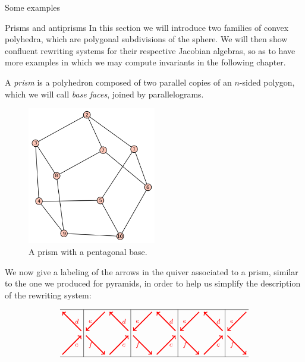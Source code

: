 \begin{chapter}{Some examples}
\begin{section}{Prisms and antiprisms}
In this section we will introduce two families of convex polyhedra, which are polygonal subdivisions of the sphere. We will then show confluent rewriting systems for their respective Jacobian algebras, so as to have more examples in which we may compute invariants in the following chapter.

A \emph{prism} is a polyhedron composed of two parallel copies of an $n$-sided polygon, which we will call \emph{base faces}, joined by parallelograms.

\begin{figure}[h]
\centering
	\includegraphics[width=0.5\textwidth]{prism.png}
\caption{A prism with a pentagonal base.}
\end{figure}

We now give a labeling of the arrows in the quiver associated to a prism, similar to the one we produced for pyramids, in order to help us simplify the description of the rewriting system:

\[
\begin{tikzpicture}[text width=1.5mm, font=\footnotesize]
\draw (-4, 0) -- (4, 0);
\draw (-4, 2) -- (4, 2);
\foreach \x in {-3,-1,...,3}
\draw (\x, 0) -- (\x, 2);
\foreach \x in {-3,-1,1}
{
\draw[->, red, very thick] (\x+1.1, 0.1) to node[right]{$c$} (\x+1.9, 0.9);
\draw[->, red, very thick] (\x+1.9, 1.1) to node[right]{$d$} (\x+1.1, 1.9);
\draw[->, red, very thick] (\x+0.9, 1.9) to node[left]{$e$} (\x+0.1, 1.1);
\draw[->, red, very thick] (\x+0.1, 0.9) to node[left]{$f$} (\x+0.9, 0.1);
}
\draw[->, red, very thick] (-5+1.1, 0.1) to node[right]{$c$} (-5+1.9, 0.9);
\draw[->, red, very thick] (-5+1.9, 1.1) to node[right]{$d$} (-5+1.1, 1.9);
\draw[->, red, very thick] (3+0.9, 1.9) to node[left]{$e$} (3+0.1, 1.1);
\draw[->, red, very thick] (3+0.1, 0.9) to node[left]{$f$} (3+0.9, 0.1);


\end{tikzpicture}\]
\end{section}
\end{chapter}

